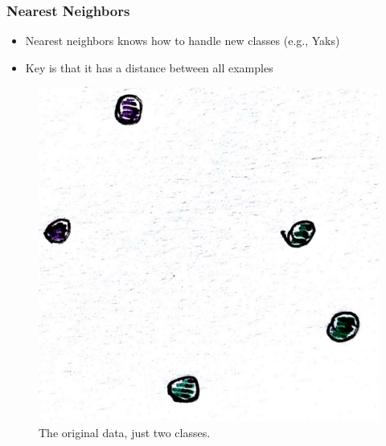 \documentclass[10pt,mathserif]{beamer}
\begin{document}
\begin{frame}
  \frametitle{Nearest Neighbors}
  \begin{itemize}
  \item Nearest neighbors knows how to handle new classes (e.g., Yaks)
  \item Key is that it has a distance between all examples
  \end{itemize} 
  \begin{figure}[ht]
    \centering
    \includegraphics[width=0.40\paperwidth]{figure/nneighbor_1}
    \caption{The original data, just two classes. \label{fig:nneighbor_1} }
  \end{figure}
\end{frame}
\end{document}
